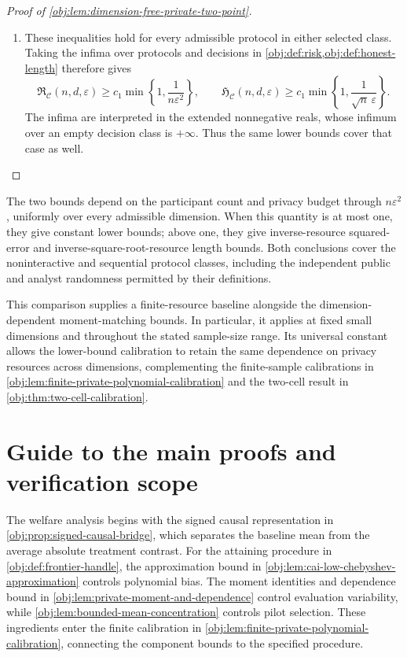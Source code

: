 \documentclass[11pt]{article}
\begin{document}
\begin{proof}[Proof of \cref{obj:lem:dimension-free-private-two-point}]
\begin{enumerate}
\item These inequalities hold for every admissible protocol in either selected class. Taking the infima over protocols and decisions in
\cref{obj:def:risk,obj:def:honest-length} therefore gives
\[
\mathfrak R_{\mathcal C}(n,d,\varepsilon)
\ge
c_1\min\left\{1,\frac1{n\varepsilon^2}\right\},
\qquad
\mathfrak H_{\mathcal C}(n,d,\varepsilon)
\ge
c_1\min\left\{1,\frac1{\sqrt n\,\varepsilon}\right\}.
\]
The infima are interpreted in the extended nonnegative reals, whose infimum over an empty decision class is \(+\infty\). Thus the same lower bounds cover that case as well.
\end{enumerate}
\end{proof}

The two bounds depend on the participant count and privacy budget through \(n\varepsilon^2\), uniformly over every admissible dimension. When this quantity is at most one, they give constant lower bounds; above one, they give inverse-resource squared-error and inverse-square-root-resource length bounds. Both conclusions cover the noninteractive and sequential protocol classes, including the independent public and analyst randomness permitted by their definitions.

This comparison supplies a finite-resource baseline alongside the dimension-dependent moment-matching bounds. In particular, it applies at fixed small dimensions and throughout the stated sample-size range. Its universal constant allows the lower-bound calibration to retain the same dependence on privacy resources across dimensions, complementing the finite-sample calibrations in \cref{obj:lem:finite-private-polynomial-calibration} and the two-cell result in \cref{obj:thm:two-cell-calibration}.


\section{Guide to the main proofs and verification scope}

The welfare analysis begins with the signed causal representation in \cref{obj:prop:signed-causal-bridge}, which separates the baseline mean from the average absolute treatment contrast. For the attaining procedure in \cref{obj:def:frontier-handle}, the approximation bound in \cref{obj:lem:cai-low-chebyshev-approximation} controls polynomial bias. The moment identities and dependence bound in \cref{obj:lem:private-moment-and-dependence} control evaluation variability, while \cref{obj:lem:bounded-mean-concentration} controls pilot selection. These ingredients enter the finite calibration in \cref{obj:lem:finite-private-polynomial-calibration}, connecting the component bounds to the specified procedure.
\end{document}
